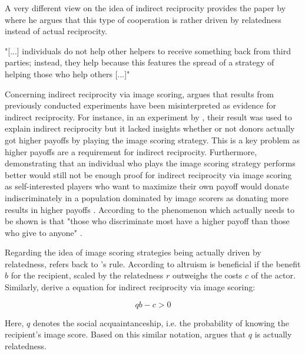 \documentclass[sigconf]{acmart}
\begin{document}
    A very different view on the idea of indirect reciprocity provides the paper by \citeauthor{roberts_kin_2019} \cite{roberts_kin_2019} where he argues that this type of cooperation is rather driven by relatedness instead of actual reciprocity.

    "[...] individuals do not help other helpers to receive something back from third parties; instead, they help because this features the spread of a strategy of helping those who help others [...]" \cite{roberts_kin_2019}


    Concerning indirect reciprocity via image scoring, \citeauthor{roberts_kin_2019} argues that results from previously conducted experiments have been misinterpreted as evidence for indirect reciprocity.
    For instance, in an experiment by \citeauthor{milinski_reputation_2002} \cite{milinski_reputation_2002}, their result was used to explain indirect reciprocity but it lacked insights whether or not donors actually got higher payoffs by playing the image scoring strategy.
    This is a key problem as higher payoffs are a requirement for indirect reciprocity.
    Furthermore, demonstrating that an individual who plays the image scoring strategy performs better would still not be enough proof for indirect reciprocity via image scoring as self-interested players who want to maximize their own payoff would donate indiscriminately in a population dominated by image scorers as donating more results in higher payoffs \cite{roberts_kin_2019}.
    According to \citeauthor{roberts_kin_2019} the phenomenon which actually needs to be shown is that "those who discriminate most have a higher payoff than those who give to anyone" \cite{roberts_kin_2019}.

    Regarding the idea of image scoring strategies being actually driven by relatedness, \citeauthor{roberts_kin_2019} refers back to \citeauthor{hamilton_kin_1964}'s rule.
    According to  altruism is beneficial if the benefit $b$ for the recipient, scaled by the relatedness $r$ outweighs the costs $c$ of the actor.
    Similarly, \citeauthor{nowak_five_2006} \cite{nowak_five_2006} derive a equation for indirect reciprocity via image scoring:

    \begin{equation}
        qb - c > 0\label{eq:qb-c}
    \end{equation}

    Here, $q$ denotes the social acquaintanceship, i.e. the probability of knowing the recipient's image score.
    Based on this similar notation, \cite{roberts_kin_2019} argues that $q$ is actually relatedness.
\end{document}
